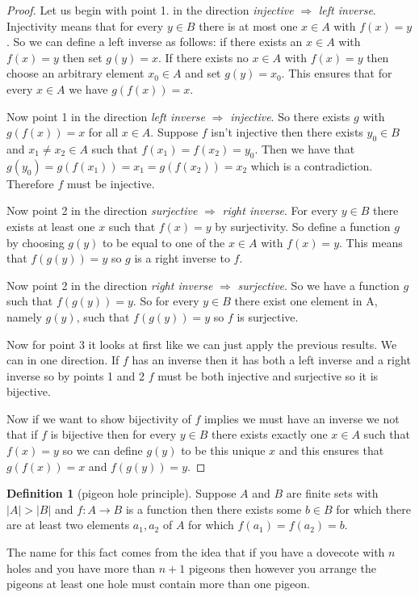 \documentclass[
]{book}
\theoremstyle{definition}
\newtheorem{definition}{Definition}[chapter]
\theoremstyle{definition}
\theoremstyle{definition}
\theoremstyle{definition}
\theoremstyle{remark}
\begin{document}
\begin{proof}
Let us begin with point 1. in the direction \emph{injective} \(\Rightarrow\) \emph{left inverse}. Injectivity means that for every \(y \in B\) there is at most one \(x \in A\) with \(f(x) = y\). So we can define a left inverse as follows: if there exists an \(x \in A\) with \(f(x)=y\) then set \(g(y) =x\). If there exists no \(x \in A\) with \(f(x)=y\) then choose an arbitrary element \(x_0 \in A\) and set \(g(y) = x_0\). This ensures that for every \(x \in A\) we have \(g(f(x))= x\).

Now point 1 in the direction \emph{left inverse} \(\Rightarrow\) \emph{injective}. So there exists \(g\) with \(g(f(x))=x\) for all \(x \in A\). Suppose \(f\) isn't injective then there exists \(y_0 \in B\) and \(x_1 \neq x_2 \in A\) such that \(f(x_1) = f(x_2) = y_0\). Then we have that \(g(y_0) = g(f(x_1))= x_1 = g(f(x_2))=x_2\) which is a contradiction. Therefore \(f\) must be injective.

Now point 2 in the direction \emph{surjective} \(\Rightarrow\) \emph{right inverse}. For every \(y \in B\) there exists at least one \(x\) such that \(f(x)=y\) by surjectivity. So define a function \(g\) by choosing \(g(y)\) to be equal to one of the \(x \in A\) with \(f(x) = y\). This means that \(f(g(y))= y\) so \(g\) is a right inverse to \(f\).

Now point 2 in the direction \emph{right inverse} \(\Rightarrow\) \emph{surjective}. So we have a function \(g\) such that \(f(g(y))=y\). So for every \(y \in B\) there exist one element in A, namely \(g(y)\), such that \(f(g(y))=y\) so \(f\) is surjective.

Now for point 3 it looks at first like we can just apply the previous results. We can in one direction. If \(f\) has an inverse then it has both a left inverse and a right inverse so by points 1 and 2 \(f\) must be both injective and surjective so it is bijective.

Now if we want to show bijectivity of \(f\) implies we must have an inverse we not that if \(f\) is bijective then for every \(y\in B\) there exists exactly one \(x \in A\) such that \(f(x) = y\) so we can define \(g(y)\) to be this unique \(x\) and this ensures that \(g(f(x))= x\) and \(f(g(y))= y\).
\end{proof}

\begin{definition}[pigeon hole principle]
Suppose \(A\) and \(B\) are finite sets with \(|A| > |B|\) and \(f: A \rightarrow B\) is a function then there exists some \(b \in B\) for which there are at least two elements \(a_1,a_2\) of \(A\) for which \(f(a_1)=f(a_2)=b\).

The name for this fact comes from the idea that if you have a dovecote with \(n\) holes and you have more than \(n+1\) pigeons then however you arrange the pigeons at least one hole must contain more than one pigeon.
\end{definition}
\end{document}
